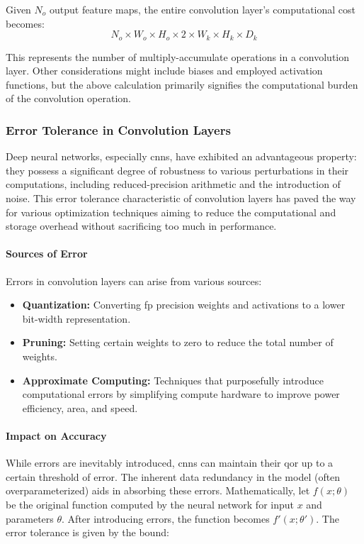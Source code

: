 Given \( N_o \) output feature maps, the entire convolution layer's computational cost becomes:
\begin{equation}
N_o \times W_o \times H_o \times 2 \times W_k \times H_k \times D_k
\end{equation}

This represents the number of multiply-accumulate operations in a convolution layer. Other considerations might include biases and employed activation functions, but the above calculation primarily signifies the computational burden of the convolution operation.

\subsubsection{Error Tolerance in Convolution Layers}

Deep neural networks, especially \glspl{cnn}, have exhibited an advantageous property: they possess a significant degree of robustness to various perturbations in their computations, including reduced-precision arithmetic and the introduction of noise. This error tolerance characteristic of convolution layers has paved the way for various optimization techniques aiming to reduce the computational and storage overhead without sacrificing too much in performance.

\paragraph{Sources of Error}

Errors in convolution layers can arise from various sources:
\begin{itemize}
	\item \textbf{Quantization:} Converting \gls{fp} precision weights and activations to a lower bit-width representation.
	\item \textbf{Pruning:} Setting certain weights to zero to reduce the total number of weights.
	\item \textbf{Approximate Computing:} Techniques that purposefully introduce computational errors by simplifying compute hardware to improve power efficiency, area, and speed.
\end{itemize}

\paragraph{Impact on Accuracy}

While errors are inevitably introduced, \glspl{cnn} can maintain their \gls{qor} up to a certain threshold of error. The inherent data redundancy in the model (often overparameterized) aids in absorbing these errors. Mathematically, let \( f(x; \theta) \) be the original function computed by the neural network for input \( x \) and parameters \( \theta \). After introducing errors, the function becomes \( f'(x; \theta') \). The error tolerance is given by the bound:

